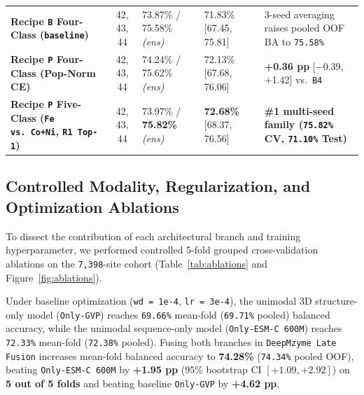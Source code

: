 \documentclass[10pt,a4paper,twocolumn]{article}
\begin{document}
\begin{table}[t!]
\begin{tabular}{lclll}
    \textbf{Recipe \texttt{B} Four-Class (\texttt{baseline})} & 42, 43, 44 & 73.87\% / 75.58\% \textit{(ens)} & 71.83\% [67.45, 75.81] & 3-seed averaging raises pooled OOF BA to \texttt{75.58\%} \\
    \textbf{Recipe \texttt{P} Four-Class (Pop-Norm CE)} & 42, 43, 44 & 74.24\% / 75.62\% \textit{(ens)} & 72.13\% [67.68, 76.06] & \textbf{+0.36 pp} [$-0.39$, +1.42] vs.\ \texttt{B4} \\
    \textbf{Recipe \texttt{P} Five-Class (\texttt{Fe vs.\ Co+Ni}, \texttt{R1 Top-1})} & 42, 43, 44 & 73.97\% / \textbf{75.82\%} \textit{(ens)} & \textbf{72.68\%} [68.37, 76.56] & \textbf{\#1 multi-seed family (\texttt{75.82\%} CV, \texttt{71.10\%} Test)} \\
    \bottomrule
  \end{tabular}
\end{table}

\subsection{Controlled Modality, Regularization, and Optimization Ablations}

To dissect the contribution of each architectural branch and training hyperparameter, we performed controlled 5-fold grouped cross-validation ablations on the \texttt{7,398}-site cohort (Table~\ref{tab:ablations} and Figure~\ref{fig:ablations}).

Under baseline optimization (\texttt{wd = 1e-4}, \texttt{lr = 3e-4}), the unimodal 3D structure-only model (\texttt{Only-GVP}) reaches \texttt{69.66\%} mean-fold (\texttt{69.71\%} pooled) balanced accuracy, while the unimodal sequence-only model (\texttt{Only-ESM-C 600M}) reaches \texttt{72.33\%} mean-fold (\texttt{72.38\%} pooled). Fusing both branches in \texttt{DeepMzyme Late Fusion} increases mean-fold balanced accuracy to \textbf{74.28\%} (\texttt{74.34\%} pooled OOF), beating \texttt{Only-ESM-C 600M} by \textbf{+1.95 pp} ($95\%$ bootstrap CI $[+1.09, +2.92]$) on \textbf{5 out of 5 folds} and beating baseline \texttt{Only-GVP} by \textbf{+4.62 pp}.
\end{document}
